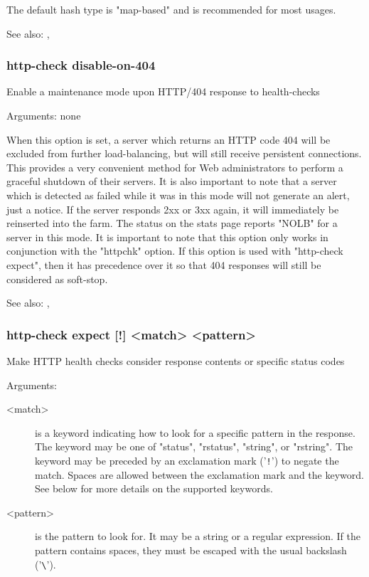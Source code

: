   The default hash type is "map-based" and is recommended for most usages.

  See also: , 

\subsubsection[http-check disable-on-404]{http-check disable-on-404}
  Enable a maintenance mode upon HTTP/404 response to health-checks
  
  
  Arguments: none

  When this option is set, a server which returns an HTTP code 404 will be
  excluded from further load-balancing, but will still receive persistent
  connections. This provides a very convenient method for Web administrators
  to perform a graceful shutdown of their servers. It is also important to note
  that a server which is detected as failed while it was in this mode will not
  generate an alert, just a notice. If the server responds 2xx or 3xx again, it
  will immediately be reinserted into the farm. The status on the stats page
  reports "NOLB" for a server in this mode. It is important to note that this
  option only works in conjunction with the "httpchk" option. If this option
  is used with "http-check expect", then it has precedence over it so that 404
  responses will still be considered as soft-stop.

  See also: , 

\subsubsection[http-check expect]{http-check expect [!] <match> <pattern>}
  Make HTTP health checks consider response contents or specific status codes
  
  
  Arguments:
  \begin{description}
  \item[<match>]   is a keyword indicating how to look for a specific pattern in the
              response. The keyword may be one of "status", "rstatus",
              "string", or "rstring". The keyword may be preceded by an
              exclamation mark ('\verb|!|') to negate the match. Spaces are allowed
              between the exclamation mark and the keyword. See below for more
              details on the supported keywords.

  \item[<pattern>] is the pattern to look for. It may be a string or a regular
              expression. If the pattern contains spaces, they must be escaped
              with the usual backslash ('\verb|\|').
  \end{description}

